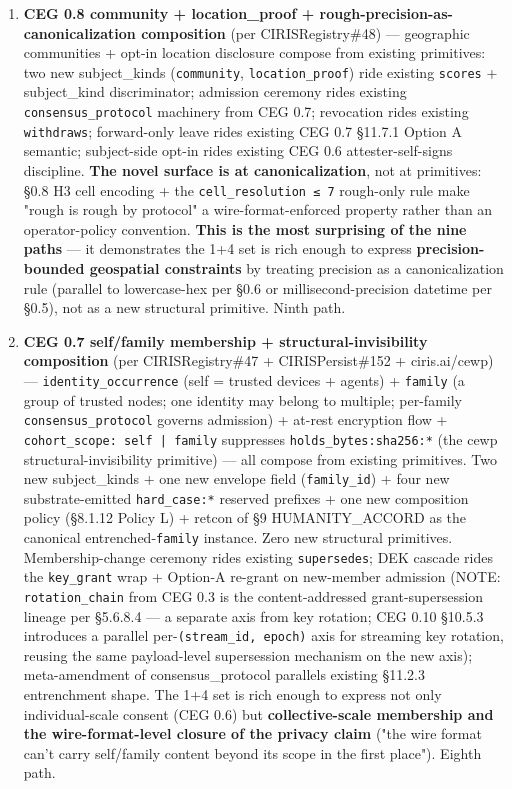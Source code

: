 \documentclass[10pt]{article}
\begin{document}
\begin{enumerate}
\item \textbf{CEG 0.8 community + location\_proof + rough-precision-as-canonicalization composition} (per CIRISRegistry\#48) — geographic communities + opt-in location disclosure compose from existing primitives: two new subject\_kinds (\texttt{community}, \texttt{location\_proof}) ride existing \texttt{scores} + subject\_kind discriminator; admission ceremony rides existing \texttt{consensus\_protocol} machinery from CEG 0.7; revocation rides existing \texttt{withdraws}; forward-only leave rides existing CEG 0.7 §11.7.1 Option A semantic; subject-side opt-in rides existing CEG 0.6 attester-self-signs discipline. \textbf{The novel surface is at canonicalization}, not at primitives: §0.8 H3 cell encoding + the \texttt{cell\_resolution ≤ 7} rough-only rule make "rough is rough by protocol" a wire-format-enforced property rather than an operator-policy convention. \textbf{This is the most surprising of the nine paths} — it demonstrates the 1+4 set is rich enough to express \textbf{precision-bounded geospatial constraints} by treating precision as a canonicalization rule (parallel to lowercase-hex per §0.6 or millisecond-precision datetime per §0.5), not as a new structural primitive. Ninth path.
\item \textbf{CEG 0.7 self/family membership + structural-invisibility composition} (per CIRISRegistry\#47 + CIRISPersist\#152 + ciris.ai/cewp) — \texttt{identity\_occurrence} (self = trusted devices + agents) + \texttt{family} (a group of trusted nodes; one identity may belong to multiple; per-family \texttt{consensus\_protocol} governs admission) + at-rest encryption flow + \texttt{cohort\_scope: self | family} suppresses \texttt{holds\_bytes:sha256:*} (the cewp structural-invisibility primitive) — all compose from existing primitives. Two new subject\_kinds + one new envelope field (\texttt{family\_id}) + four new substrate-emitted \texttt{hard\_case:*} reserved prefixes + one new composition policy (§8.1.12 Policy L) + retcon of §9 HUMANITY\_ACCORD as the canonical entrenched-\texttt{family} instance. Zero new structural primitives. Membership-change ceremony rides existing \texttt{supersedes}; DEK cascade rides the \texttt{key\_grant} wrap + Option-A re-grant on new-member admission (NOTE: \texttt{rotation\_chain} from CEG 0.3 is the content-addressed grant-supersession lineage per §5.6.8.4 — a separate axis from key rotation; CEG 0.10 §10.5.3 introduces a parallel per-\texttt{(stream\_id, epoch)} axis for streaming key rotation, reusing the same payload-level supersession mechanism on the new axis); meta-amendment of consensus\_protocol parallels existing §11.2.3 entrenchment shape. The 1+4 set is rich enough to express not only individual-scale consent (CEG 0.6) but \textbf{collective-scale membership and the wire-format-level closure of the privacy claim} ("the wire format can't carry self/family content beyond its scope in the first place"). Eighth path.

\end{enumerate}
\end{document}
